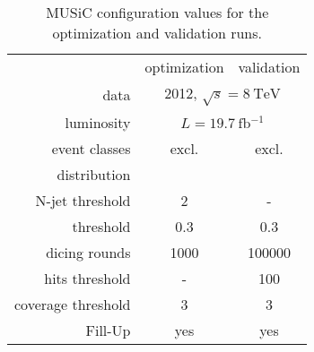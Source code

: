 \begin{table}[htbp]
	\centering
	\begin{tabular}{ r | c | c |}
		\cline{2-3}
		& optimization & validation \\ \cline{2-3}
		data & \multicolumn{2}{c|}{2012, $\sqrt{s} = \SI{8}{\TeV}$} \\ 
		luminosity & \multicolumn{2}{c|}{ $L = \SI{19.7}{\femto\barn^{-1}}$ } \\ \cline{2-3}
		event classes & excl. & excl. \\ 
		distribution & \sumpT & \Minv \\
		N-jet threshold & \num{2} & - \\
		\p~threshold & \num{0.3} & \num{0.3} \\
		dicing rounds & \num{1000} & \num{100000} \\
		hits threshold & - & \num{100} \\
		coverage threshold & \num{3} & \num{3} \\
		Fill-Up & yes & yes \\
		\cline{2-3}
	\end{tabular}
	\caption{MUSiC configuration values for the optimization and validation runs.}
	\label{tbl:music_configuration}
\end{table}